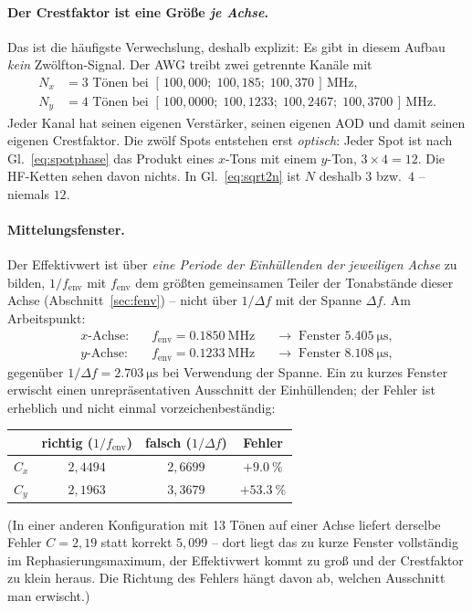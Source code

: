 \documentclass[11pt,a4paper]{article}
\newcommand{\crest}{\ensuremath{C}}
\begin{document}
\paragraph{Der Crestfaktor ist eine Größe \emph{je Achse}.}
Das ist die häufigste Verwechslung, deshalb explizit: Es gibt in diesem
Aufbau \emph{kein} Zwölfton-Signal. Der AWG treibt zwei getrennte Kanäle mit
\begin{align}
  N_x &= 3 \text{ Tönen bei } [\,100{,}000;\;100{,}185;\;100{,}370\,]\,\si{\mega\hertz},\\
  N_y &= 4 \text{ Tönen bei } [\,100{,}0000;\;100{,}1233;\;100{,}2467;\;100{,}3700\,]\,\si{\mega\hertz}.
\end{align}
Jeder Kanal hat seinen eigenen Verstärker, seinen eigenen AOD und damit
seinen eigenen Crestfaktor. Die zwölf Spots entstehen erst \emph{optisch}:
Jeder Spot ist nach Gl.~\eqref{eq:spotphase} das Produkt eines $x$-Tons mit
einem $y$-Ton, $3\times4 = 12$. Die HF-Ketten sehen davon nichts. In
Gl.~\eqref{eq:sqrt2n} ist $N$ deshalb $3$ bzw.\ $4$ -- niemals $12$.

\paragraph{Mittelungsfenster.}
Der Effektivwert ist über \emph{eine Periode der Einhüllenden der jeweiligen
Achse} zu bilden, $1/f_\mathrm{env}$ mit $f_\mathrm{env}$ dem größten
gemeinsamen Teiler der Tonabstände dieser Achse (Abschnitt~\ref{sec:fenv}) -- nicht über $1/\Delta f$
mit der Spanne $\Delta f$. Am Arbeitspunkt:
\begin{align}
  \text{$x$-Achse:}\quad & f_\mathrm{env} = \SI{0.1850}{\mega\hertz}
    && \rightarrow\; \text{Fenster } \SI{5.405}{\micro\second},\\
  \text{$y$-Achse:}\quad & f_\mathrm{env} = \SI{0.1233}{\mega\hertz}
    && \rightarrow\; \text{Fenster } \SI{8.108}{\micro\second},
\end{align}
gegenüber $1/\Delta f = \SI{2.703}{\micro\second}$ bei Verwendung der Spanne.
Ein zu kurzes Fenster erwischt einen unrepräsentativen Ausschnitt der
Einhüllenden; der Fehler ist erheblich und nicht einmal
vorzeichenbeständig:
\begin{center}
\begin{tabular}{lccc}
  \toprule
  & richtig ($1/f_\mathrm{env}$) & falsch ($1/\Delta f$) & Fehler\\
  \midrule
  $\crest_x$ & $2{,}4494$ & $2{,}6699$ & $+\SI{9.0}{\percent}$\\
  $\crest_y$ & $2{,}1963$ & $3{,}3679$ & $+\SI{53.3}{\percent}$\\
  \bottomrule
\end{tabular}
\end{center}
(In einer anderen Konfiguration mit 13 Tönen auf einer Achse liefert derselbe
Fehler $\crest = 2{,}19$ statt korrekt $5{,}099$ -- dort liegt das zu kurze
Fenster vollständig im Rephasierungsmaximum, der Effektivwert kommt zu groß
und der Crestfaktor zu klein heraus. Die Richtung des Fehlers hängt davon ab,
welchen Ausschnitt man erwischt.)
\end{document}
